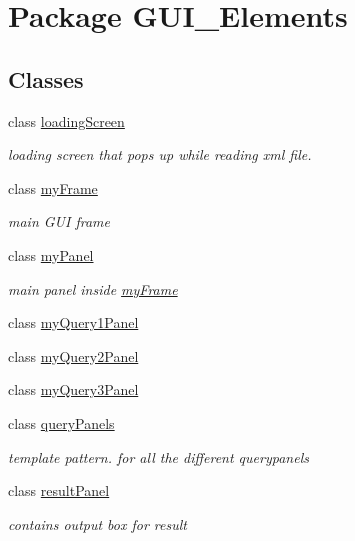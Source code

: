 \hypertarget{namespace_g_u_i___elements}{}\section{Package G\+U\+I\+\_\+\+Elements}
\label{namespace_g_u_i___elements}
\subsection*{Classes}
\begin{DoxyCompactItemize}
\item 
class \hyperlink{class_g_u_i___elements_1_1loading_screen}{loading\+Screen}
\begin{DoxyCompactList}\small\item\em loading screen that pops up while reading xml file. \end{DoxyCompactList}\item 
class \hyperlink{class_g_u_i___elements_1_1my_frame}{my\+Frame}
\begin{DoxyCompactList}\small\item\em main G\+UI frame \end{DoxyCompactList}\item 
class \hyperlink{class_g_u_i___elements_1_1my_panel}{my\+Panel}
\begin{DoxyCompactList}\small\item\em main panel inside \hyperlink{class_g_u_i___elements_1_1my_frame}{my\+Frame} \end{DoxyCompactList}\item 
class \hyperlink{class_g_u_i___elements_1_1my_query1_panel}{my\+Query1\+Panel}
\item 
class \hyperlink{class_g_u_i___elements_1_1my_query2_panel}{my\+Query2\+Panel}
\item 
class \hyperlink{class_g_u_i___elements_1_1my_query3_panel}{my\+Query3\+Panel}
\item 
class \hyperlink{class_g_u_i___elements_1_1query_panels}{query\+Panels}
\begin{DoxyCompactList}\small\item\em template pattern. for all the different querypanels \end{DoxyCompactList}\item 
class \hyperlink{class_g_u_i___elements_1_1result_panel}{result\+Panel}
\begin{DoxyCompactList}\small\item\em contains output box for result \end{DoxyCompactList}\end{DoxyCompactItemize}
